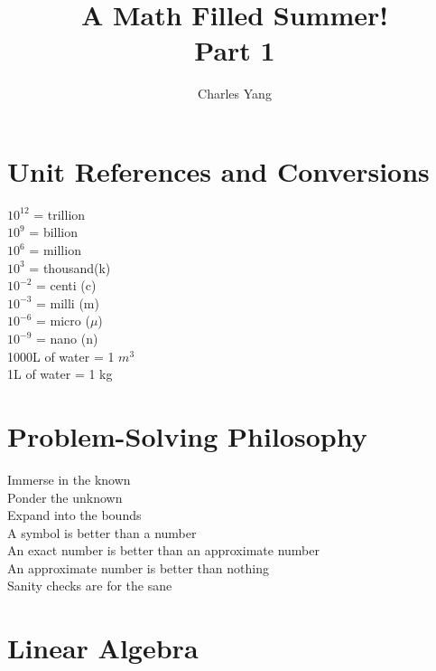 \documentclass{article}
\title{%
  A Math Filled Summer! \\
  \large Part 1}
\author{Charles Yang }
\begin{document}
\maketitle
\begin{center}
    \section*{Unit References and Conversions}
    $10^{12}$ = trillion\\
    $10^9$ = billion\\
    $10^6$ = million\\
    $10^3$ = thousand(k)\\
    $10^{-2}$ = centi (c)\\
    $10^{-3}$ = milli (m)\\
    $10^{-6}$ = micro ($\mu$)\\
    $10^{-9}$ = nano (n)\\
    1000L of water = 1 $m^3$\\
    1L of water = 1 kg\\
    
    
    \section*{Problem-Solving Philosophy}
    Immerse in the known\\
    Ponder the unknown\\
    Expand into the bounds\\
    A symbol is better than a number\\
    An exact number is better than an approximate number\\
    An approximate number is better than nothing\\
    Sanity checks are for the sane\\
    
    
\end{center}

\newpage

\section{Linear Algebra}
\end{document}
